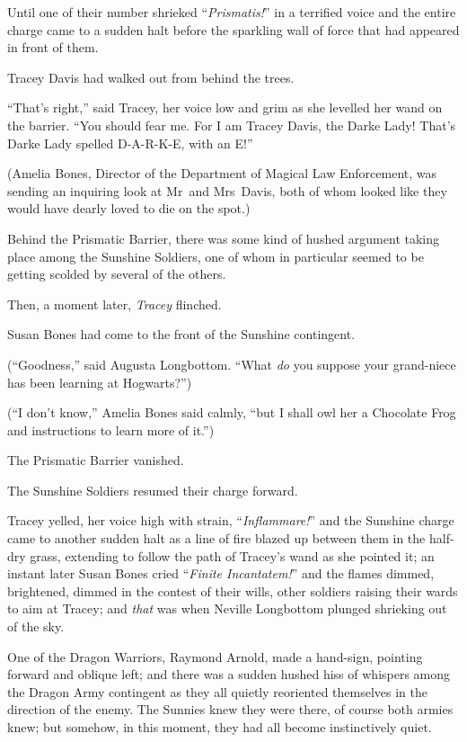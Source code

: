 Until one of their number shrieked “\emph{Prismatis!}” in a terrified voice and the entire charge came to a sudden halt before the sparkling wall of force that had appeared in front of them.

Tracey Davis had walked out from behind the trees.

“That’s right,” said Tracey, her voice low and grim as she levelled her wand on the barrier. “You should fear me. For I am Tracey Davis, the Darke Lady! That’s Darke Lady spelled D-A-R-K-E, with an E!”

(Amelia Bones, Director of the Department of Magical Law Enforcement, was sending an inquiring look at Mr~and Mrs~Davis, both of whom looked like they would have dearly loved to die on the spot.)

Behind the Prismatic Barrier, there was some kind of hushed argument taking place among the Sunshine Soldiers, one of whom in particular seemed to be getting scolded by several of the others.

Then, a moment later, \emph{Tracey} flinched.

Susan Bones had come to the front of the Sunshine contingent.

(“Goodness,” said Augusta Longbottom. “What \emph{do} you suppose your grand-niece has been learning at Hogwarts?”)

(“I don’t know,” Amelia Bones said calmly, “but I shall owl her a Chocolate Frog and instructions to learn more of it.”)

The Prismatic Barrier vanished.

The Sunshine Soldiers resumed their charge forward.

Tracey yelled, her voice high with strain, “\emph{Inflammare!}” and the Sunshine charge came to another sudden halt as a line of fire blazed up between them in the half-dry grass, extending to follow the path of Tracey’s wand as she pointed it; an instant later Susan Bones cried “\emph{Finite Incantatem!}” and the flames dimmed, brightened, dimmed in the contest of their wills, other soldiers raising their wards to aim at Tracey; and \emph{that} was when Neville Longbottom plunged shrieking out of the sky.

\later

One of the Dragon Warriors, Raymond Arnold, made a hand-sign, pointing forward and oblique left; and there was a sudden hushed hiss of whispers among the Dragon Army contingent as they all quietly reoriented themselves in the direction of the enemy. The Sunnies knew they were there, of course both armies knew; but somehow, in this moment, they had all become instinctively quiet.

